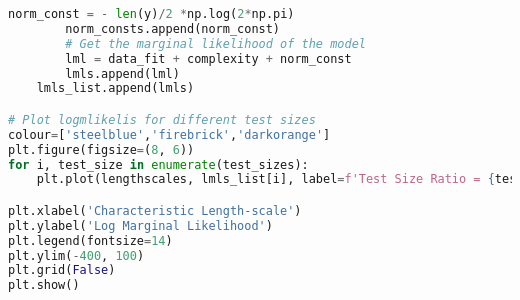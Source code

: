 \documentclass[12pt,a4paper]{article}
\begin{document}
\begin{lstlisting}[language=python, caption={Code of the Creation of Figure \ref{fig:logml analysis plots}}]
        norm_const = - len(y)/2 *np.log(2*np.pi) 
        norm_consts.append(norm_const)
        # Get the marginal likelihood of the model
        lml = data_fit + complexity + norm_const
        lmls.append(lml)
    lmls_list.append(lmls)

# Plot logmlikelis for different test sizes
colour=['steelblue','firebrick','darkorange']
plt.figure(figsize=(8, 6))
for i, test_size in enumerate(test_sizes):
    plt.plot(lengthscales, lmls_list[i], label=f'Test Size Ratio = {test_size}',color=colour[i], linewidth=3)

plt.xlabel('Characteristic Length-scale')
plt.ylabel('Log Marginal Likelihood')
plt.legend(fontsize=14)
plt.ylim(-400, 100)
plt.grid(False)
plt.show()
\end{lstlisting}

\vspace{10pt}
\end{document}
